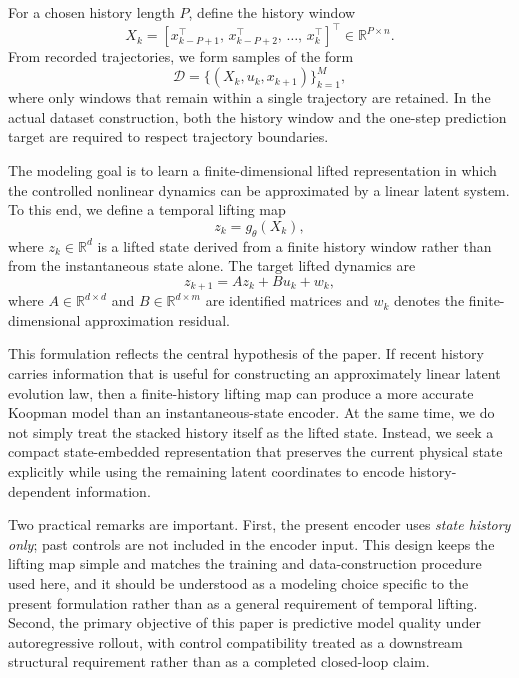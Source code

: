 \documentclass[journal]{IEEEtran}
\begin{document}
For a chosen history length $P$, define the history window
\begin{equation}
    X_k = [x_{k-P+1}^\top,\,x_{k-P+2}^\top,\,\ldots,\,x_k^\top]^\top \in \mathbb{R}^{P\times n}.
    \label{eq:history_window}
\end{equation}
From recorded trajectories, we form samples of the form
\begin{equation}
    \mathcal{D} = \{(X_k,u_k,x_{k+1})\}_{k=1}^{M},
    \label{eq:dataset}
\end{equation}
where only windows that remain within a single trajectory are retained. In the actual dataset construction, both the history window and the one-step prediction target are required to respect trajectory boundaries.

The modeling goal is to learn a finite-dimensional lifted representation in which the controlled nonlinear dynamics can be approximated by a linear latent system. To this end, we define a temporal lifting map
\begin{equation}
    z_k = g_\theta(X_k),
    \label{eq:temporal_lifting}
\end{equation}
where $z_k \in \mathbb{R}^d$ is a lifted state derived from a finite history window rather than from the instantaneous state alone. The target lifted dynamics are
\begin{equation}
    z_{k+1} = A z_k + B u_k + w_k,
    \label{eq:lifted_dynamics}
\end{equation}
where $A \in \mathbb{R}^{d\times d}$ and $B \in \mathbb{R}^{d\times m}$ are identified matrices and $w_k$ denotes the finite-dimensional approximation residual.

This formulation reflects the central hypothesis of the paper. If recent history carries information that is useful for constructing an approximately linear latent evolution law, then a finite-history lifting map can produce a more accurate Koopman model than an instantaneous-state encoder. At the same time, we do not simply treat the stacked history itself as the lifted state. Instead, we seek a compact state-embedded representation that preserves the current physical state explicitly while using the remaining latent coordinates to encode history-dependent information.

Two practical remarks are important. First, the present encoder uses \emph{state history only}; past controls are not included in the encoder input. This design keeps the lifting map simple and matches the training and data-construction procedure used here, and it should be understood as a modeling choice specific to the present formulation rather than as a general requirement of temporal lifting. Second, the primary objective of this paper is predictive model quality under autoregressive rollout, with control compatibility treated as a downstream structural requirement rather than as a completed closed-loop claim.
\end{document}
